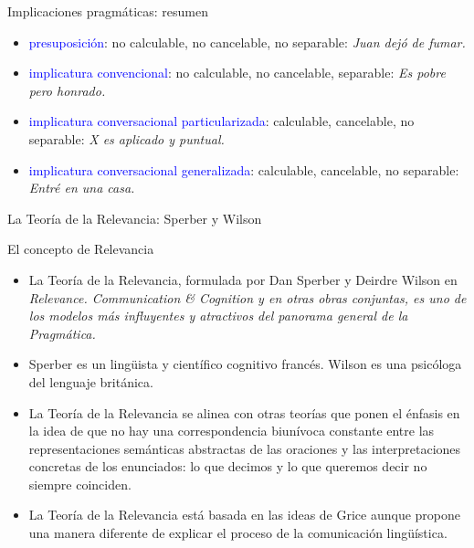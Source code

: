 \documentclass{beamer}
\begin{document}
\begin{frame}{Implicaciones pragmáticas: resumen}

	\begin{itemize}
		\item \textcolor{blue}{presuposición}: no calculable, no cancelable, no separable: \it{Juan dejó de fumar}.
		\item \textcolor{blue}{implicatura convencional}: no calculable, no cancelable, separable: \it{Es pobre pero honrado}.
		\item \textcolor{blue}{implicatura conversacional particularizada}: calculable, cancelable, no separable: \it{X es aplicado y puntual}.
		\item \textcolor{blue}{implicatura conversacional generalizada}: calculable, cancelable, no separable: \it{Entré en una casa}.
		
	\end{itemize}
\end{frame}

\begin{frame}{}
\begin{center}
  \LARGE{La Teoría de la Relevancia: Sperber y Wilson}
\end{center} 
\end{frame}

\begin{frame}{El concepto de Relevancia}

	\begin{itemize}
		\item La Teoría de la Relevancia, formulada por Dan Sperber y Deirdre Wilson en \it{Relevance. Communication \& Cognition} y en otras obras conjuntas, es uno de los modelos más influyentes y atractivos del panorama general de la Pragmática.
		\item Sperber es un lingüista y científico cognitivo francés. Wilson es una psicóloga del lenguaje británica. 
		\item La Teoría de la Relevancia se alinea con otras teorías que ponen el énfasis en la idea de que no hay una correspondencia biunívoca constante entre las representaciones semánticas abstractas de las oraciones y las interpretaciones concretas de los enunciados: lo que decimos y lo que queremos decir no siempre coinciden. 
		\item La Teoría de la Relevancia está basada en las ideas de Grice aunque propone una manera diferente de explicar el proceso de la comunicación lingüística.
	\end{itemize}

\end{frame}
\end{document}
